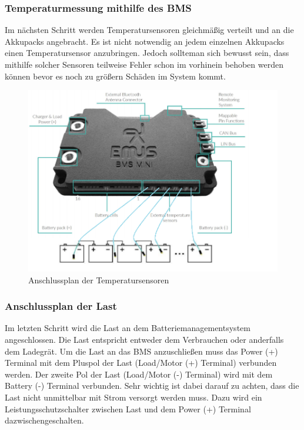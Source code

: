 \newpage
\subsubsection{Temperaturmessung mithilfe des BMS}

Im nächsten Schritt werden Temperatursensoren gleichmäßig verteilt und an die Akkupacks angebracht. Es ist nicht notwendig an jedem einzelnen Akkupacks einen Temperatursensor anzubringen. Jedoch sollteman sich bewusst sein, dass mithilfe solcher Sensoren teilweise Fehler schon im vorhinein behoben werden können bevor es noch zu größern Schäden im System kommt.

\begin{figure}[H]
	\begin{center}
		\includegraphics[scale=0.7]{figures/Akku/SystemStrukturBMSTemperatur.png}
		\caption{Anschlussplan der Temperatursensoren}
	\end{center}
\end{figure}
\newpage

\subsubsection{Anschlussplan der Last}

Im letzten Schritt wird die Last an dem Batteriemanagementsystem angeschlossen. Die Last entspricht entweder dem Verbrauchen oder anderfalls dem Ladegrät. Um die Last an das BMS anzuschließen muss das Power (+) Terminal mit dem Pluspol der Last (Load/Motor (+) Terminal) verbunden werden. Der zweite Pol der Last (Load/Motor (-) Terminal) wird mit dem Battery (-) Terminal verbunden. Sehr wichtig ist dabei darauf zu achten, dass die Last nicht unmittelbar mit Strom versorgt werden muss. Dazu wird ein Leistungsschutzschalter zwischen Last und dem Power (+) Terminal dazwischengeschalten.

